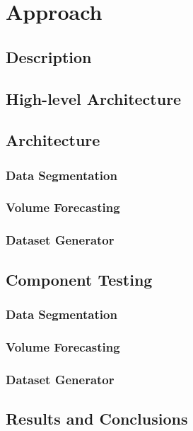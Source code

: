 \chapter{Approach}\label{chap:chap4}

\section*{}

\section{Description}

\section{High-level Architecture}

\section{Architecture}

\subsection{Data Segmentation}

\subsection{Volume Forecasting}

\subsection{Dataset Generator}

\section{Component Testing}

\subsection{Data Segmentation}

\subsection{Volume Forecasting}

\subsection{Dataset Generator}


\section{Results and Conclusions}

